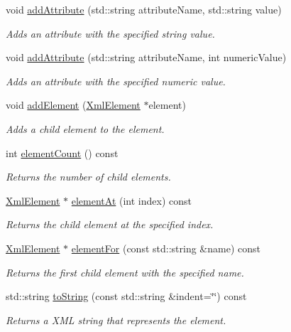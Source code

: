\begin{DoxyCompactItemize}
\item 
void \hyperlink{classXmlElement_a14387be9ca6d014a38e95a7aa98f86c5}{addAttribute} (std::string attributeName, std::string value)
\begin{DoxyCompactList}\small\item\em Adds an attribute with the specified string value. \item\end{DoxyCompactList}\item 
void \hyperlink{classXmlElement_aec69fb49cf9e563cff9858ddc818f055}{addAttribute} (std::string attributeName, int numericValue)
\begin{DoxyCompactList}\small\item\em Adds an attribute with the specified numeric value. \item\end{DoxyCompactList}\item 
void \hyperlink{classXmlElement_a444321a1de2a7f52994c53f9e6e0d942}{addElement} (\hyperlink{classXmlElement}{XmlElement} $\ast$element)
\begin{DoxyCompactList}\small\item\em Adds a child element to the element. \item\end{DoxyCompactList}\item 
int \hyperlink{classXmlElement_a2aad0dda599cb46f85ff6b4b897045b9}{elementCount} () const 
\begin{DoxyCompactList}\small\item\em Returns the number of child elements. \item\end{DoxyCompactList}\item 
\hyperlink{classXmlElement}{XmlElement} $\ast$ \hyperlink{classXmlElement_a083d56e5d6e8ef4f4ed462b3206b3af2}{elementAt} (int index) const 
\begin{DoxyCompactList}\small\item\em Returns the child element at the specified index. \item\end{DoxyCompactList}\item 
\hyperlink{classXmlElement}{XmlElement} $\ast$ \hyperlink{classXmlElement_a6babcb48cd31c025234ad35db5ebce3e}{elementFor} (const std::string \&name) const 
\begin{DoxyCompactList}\small\item\em Returns the first child element with the specified name. \item\end{DoxyCompactList}\item 
std::string \hyperlink{classXmlElement_a2e783a5fed6b5b31b2d11117e6c83d40}{toString} (const std::string \&indent=\char`\"{}\char`\"{}) const 
\begin{DoxyCompactList}\small\item\em Returns a XML string that represents the element. \item\end{DoxyCompactList}\end{DoxyCompactItemize}


